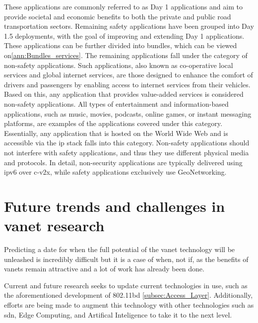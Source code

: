 These applications are commonly referred to as Day 1 applications and aim to provide societal and economic benefits to both the private and public road transportation sectors. Remaining safety applications have been grouped into Day 1.5 deployments, with the goal of improving and extending Day 1 applications. These applications can be further divided into bundles, which can be viewed on\ref{ann:Bundles_services}.
The remaining applications fall under the category of non-safety applications. Such applications, also known as co-operative local services and global internet services, are those designed to enhance the comfort of drivers and passengers by enabling access to internet services from their vehicles\cite{al-sultan_comprehensive_2014}. Based on this, any application that provides value-added services is considered non-safety applications\cite{toor_vehicle_2008}.
All types of entertainment and information-based applications, such as music, movies, podcasts, online games, or instant messaging platforms, are examples of the applications covered under this category. Essentially, any application that is hosted on the World Wide Web and is accessible via the \gls{ip} stack falls into this category.
Non-safety applications should not interfere with safety applications, and thus they use different physical media and protocols\cite{jakubiak_state_2008}. In detail, non-security applications are typically delivered using \gls{ipv6} over \gls{c-v2x}, while safety applications exclusively use GeoNetworking.


\section[Future trends and challenges in VANET research]{Future trends and challenges in \gls{vanet} research}
\label{sec:vanet_future}

Predicting a date for when the full potential of the \gls{vanet} technology will be unleashed is incredibly difficult but it is a case of when, not if, as the benefits of \glspl{vanet} remain attractive and a lot of work has already been done. 

Current and future research seeks to update current technologies in use, such as the aforementioned development of 802.11bd \ref{subsec:Access_Layer}. Additionally, efforts are being made to augment this technology with other technologies such as \gls{sdn}, Edge Computing, and Artifical Inteligence to take it to the next level\cite{mahi_review_2022}.

